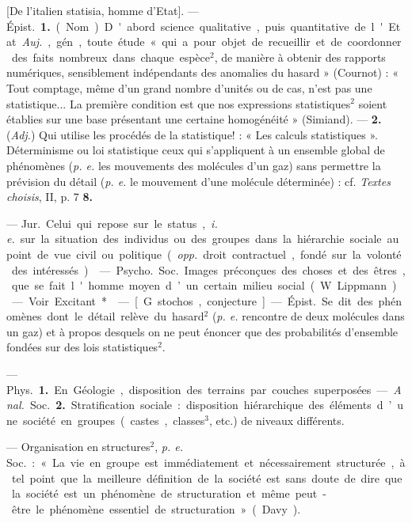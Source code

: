 \begin{itemize}[leftmargin=1cm, label=, itemsep=1pt]
 [De l'italien statisia, homme
d'Etat]. — \si{Épist.} {\bf 1.} (Nom). D'abord
science qualitative, puis quantitative de l'Etat. {\it Auj.}, gén, toute
étude « qui a pour objet de recueillir
et de coordonner des faits nombreux dans chaque espèce$^2$, de manière à obtenir des rapports numériques, sensiblement indépendants
des anomalies du hasard » (Cournot) :
« Tout comptage, même d’un grand
nombre d'unités ou de cas, n’est pas
une statistique... La première condition est que nos expressions statistiques$^2$ soient établies sur une base
présentant une certaine homogénéité » (Simiand). — {\bf 2.} ({\it Adj.}) Qui
utilise les procédés de la statistique! : « Les calculs statistiques ».
Déterminisme ou loi statistique
ceux qui s'appliquent à un ensemble
global de phénomènes ({\it p. e.} les mouvements des molécules d’un gaz)
sans permettre la prévision du détail
({\it p. e.} le mouvement d’une molécule
déterminée) : cf. {\it Textes choisis}, II,
p. 7 {\bf 8.}

 — \si{Jur.} Celui qui
repose sur le status, {\it i. e.} sur la situation des individus ou des groupes
dans la hiérarchie sociale au point
de vue civil ou politique ({\it opp.} droit
contractuel, fondé sur la volonté
des intéressés).

 — \si{Psycho.} \si{Soc.} Images
préconçues des choses et des êtres,
que se fait l'homme moyen d’un
certain milieu social (W. Lippmann).

 — Voir Excitant*.

 — [G. stochos, conjecture] — \si{Épist.} Se dit des phénomènes
dont le détail relève du
hasard$^2$ ({\it p. e.} rencontre de deux molécules dans un gaz) et à propos desquels on ne peut énoncer que des
probabilités d'ensemble fondées sur
des lois statistiques$^2$.

 — \si{Phys.} {\bf 1.} En Géologie,
disposition des terrains par couches
superposées. — {\it Anal.} \si{Soc.} {\bf 2.} Stratification sociale : disposition hiérarchique
des éléments d’une société en groupes
(castes, classes$^3$, etc.) de niveaux
différents.

 — Organisation en
structures$^2$, {\it p. e.} \si{Soc.} : « La vie en
groupe est immédiatement et nécessairement structurée, à tel point
que la meilleure définition de la
société est sans doute de dire que la
société est un phénomène de structuration et même peut-être le phénomène essentiel de structuration »
(Davy).


\end{itemize}
